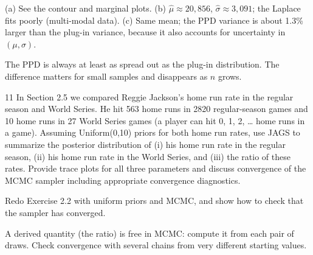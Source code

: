 \documentclass[11pt]{article}
\begin{document}
\begin{answer}
(a) See the contour and marginal plots. (b) $\hat\mu\approx20{,}856$, $\hat\sigma\approx3{,}091$; the Laplace fits poorly (multi-modal data). (c) Same mean; the PPD variance is about 1.3\% larger than the plug-in variance, because it also accounts for uncertainty in $(\mu,\sigma)$.
\end{answer}

\begin{takeaway}
The PPD is always at least as spread out as the plug-in distribution. The difference matters for small samples and disappears as $n$ grows.
\end{takeaway}


\begin{problem}{11}
In Section 2.5 we compared Reggie Jackson's home run rate in the regular season and World Series. He hit 563 home runs in 2820 regular-season games and 10 home runs in 27 World Series games (a player can hit 0, 1, 2, \dots{} home runs in a game). Assuming Uniform(0,10) priors for both home run rates, use JAGS to summarize the posterior distribution of (i) his home run rate in the regular season, (ii) his home run rate in the World Series, and (iii) the ratio of these rates. Provide trace plots for all three parameters and discuss convergence of the MCMC sampler including appropriate convergence diagnostics.
\end{problem}

\begin{restate}
Redo Exercise 2.2 with uniform priors and MCMC, and show how to check that the sampler has converged.
\end{restate}

\begin{keyidea}
A derived quantity (the ratio) is free in MCMC: compute it from each pair of draws. Check convergence with several chains from very different starting values.
\end{keyidea}
\end{document}
